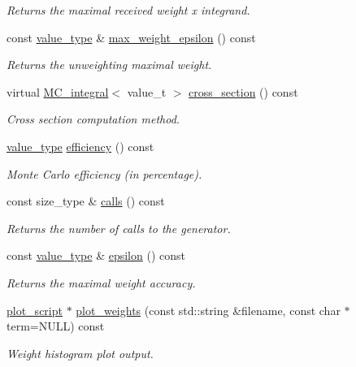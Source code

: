 \begin{DoxyCompactItemize}
\begin{DoxyCompactList}\small\item\em Returns the maximal received weight x integrand. \end{DoxyCompactList}\item 
\hypertarget{a00369_a3501cb313d3d3ff7dbe5dcfedc3690c2}{}const \hyperlink{a00369_a06caf6de1272e36a9281c3db764e6f16}{value\+\_\+type} \& \hyperlink{a00369_a3501cb313d3d3ff7dbe5dcfedc3690c2}{max\+\_\+weight\+\_\+epsilon} () const \label{a00369_a3501cb313d3d3ff7dbe5dcfedc3690c2}

\begin{DoxyCompactList}\small\item\em Returns the unweighting maximal weight. \end{DoxyCompactList}\item 
virtual \hyperlink{a00368}{M\+C\+\_\+integral}$<$ value\+\_\+t $>$ \hyperlink{a00369_a95e511e34efdc1a1a827900eee1f34f8}{cross\+\_\+section} () const 
\begin{DoxyCompactList}\small\item\em Cross section computation method. \end{DoxyCompactList}\item 
\hypertarget{a00369_a437588907bc825b3d5cd7b5b9e59fe8e}{}\hyperlink{a00369_a06caf6de1272e36a9281c3db764e6f16}{value\+\_\+type} \hyperlink{a00369_a437588907bc825b3d5cd7b5b9e59fe8e}{efficiency} () const \label{a00369_a437588907bc825b3d5cd7b5b9e59fe8e}

\begin{DoxyCompactList}\small\item\em Monte Carlo efficiency (in percentage). \end{DoxyCompactList}\item 
\hypertarget{a00369_a5463e23a1e23b07b650125005ab09278}{}const size\+\_\+type \& \hyperlink{a00369_a5463e23a1e23b07b650125005ab09278}{calls} () const \label{a00369_a5463e23a1e23b07b650125005ab09278}

\begin{DoxyCompactList}\small\item\em Returns the number of calls to the generator. \end{DoxyCompactList}\item 
\hypertarget{a00369_a57f5fa456343acd7e0d81d28e94f01f3}{}const \hyperlink{a00369_a06caf6de1272e36a9281c3db764e6f16}{value\+\_\+type} \& \hyperlink{a00369_a57f5fa456343acd7e0d81d28e94f01f3}{epsilon} () const \label{a00369_a57f5fa456343acd7e0d81d28e94f01f3}

\begin{DoxyCompactList}\small\item\em Returns the maximal weight accuracy. \end{DoxyCompactList}\item 
\hyperlink{a00431}{plot\+\_\+script} $\ast$ \hyperlink{a00369_a0e5bae6e7effce8ad58839b773f196d9}{plot\+\_\+weights} (const std\+::string \&filename, const char $\ast$term=N\+U\+L\+L) const 
\begin{DoxyCompactList}\small\item\em Weight histogram plot output. \end{DoxyCompactList}\end{DoxyCompactItemize}
